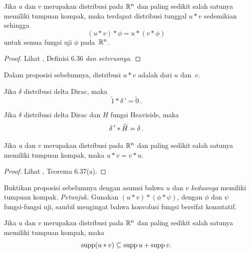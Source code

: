 \begin{prop} Jika $u$ dan $v$ merupakan distribusi pada $\mathbb{R}^n$ dan paling sedikit salah satunya memiliki tumpuan kompak, maka terdapat distribusi tunggal
$u \ast v$ sedemikian sehingga
   \[ (u \ast v) \ast \phi = u \ast (v \ast \phi) \]
untuk semua fungsi uji $\phi$ pada~$\mathbb{R}^n$.
\end{prop}

\begin{proof} Lihat \cite{Rudin:1991}, Definisi 6.36\emph{ dan seterusnya}.   \ns
\end{proof}

\begin{defn} Dalam proposisi sebelumnya, distribusi $u \ast v$ adalah
 dari $u$ dan~$v$.
\end{defn}

\begin{exam} Jika $\delta$ distribusi delta Dirac, maka
   \[ \tilde 1 \ast \delta\,' = \tilde 0\,. \]
\end{exam}

\begin{exam} Jika $\delta$ distribusi delta Dirac dan $H$ fungsi Heaviside, maka
   \[ \delta\,' \ast \widetilde{H} = \delta\,. \]
\end{exam}

\begin{prop} Jika $u$ dan $v$ merupakan distribusi pada $\mathbb{R}^n$ dan paling sedikit salah satunya memiliki tumpuan kompak, maka $u \ast v = v \ast u$.
\end{prop}

\begin{proof} Lihat \cite{Rudin:1991}, Teorema 6.37(a).  \ns
\end{proof}

\begin{exer} Buktikan proposisi sebelumnya dengan asumsi bahwa $u$ dan $v$ \emph{keduanya} memiliki tumpuan kompak. \emph{Petunjuk.}
Gunakan $(u \ast v) \ast (\phi \ast \psi)$, dengan $\phi$ dan $\psi$ fungsi-fungsi uji, sambil mengingat bahwa konvolusi fungsi
bersifat komutatif.
\end{exer}

\begin{prop} Jika $u$ dan $v$ merupakan distribusi pada $\mathbb{R}^n$ dan paling sedikit salah satunya memiliki tumpuan kompak, maka
  \[ \operatorname{supp}(u \ast v) \subseteq \operatorname{supp} u + \operatorname{supp} v. \]
\end{prop}

